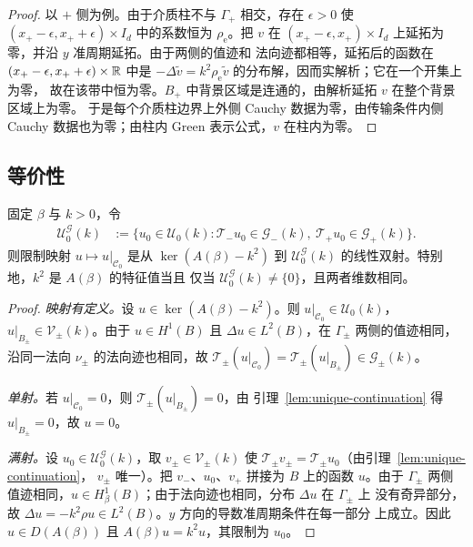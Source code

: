 \begin{proof}
  以 $+$ 侧为例。由于介质柱不与 $\Gamma_+$ 相交，存在 $\epsilon>0$ 使
  $(x_+-\epsilon,x_++\epsilon)\times I_d$ 中的系数恒为 $\rho_{\mathrm e}$。把 $v$ 在
  $(x_+-\epsilon,x_+)\times I_d$ 上延拓为零，并沿 $y$ 准周期延拓。由于两侧的值迹和
  法向迹都相等，延拓后的函数在 $(x_+-\epsilon,x_++\epsilon)\times\mathbb{R}$ 中是
  $-\Delta\tilde v=k^2\rho_{\mathrm e}\tilde v$ 的分布解，因而实解析；它在一个开集上为零，
  故在该带中恒为零。$B_+$ 中背景区域是连通的，由解析延拓 $v$ 在整个背景区域上为零。
  于是每个介质柱边界上外侧 Cauchy 数据为零，由传输条件内侧 Cauchy 数据也为零；由柱内
  Green 表示公式，$v$ 在柱内为零。
\end{proof}

\subsection{等价性}

\begin{proposition}[中心约化]
  \label{prop:center-reduction}
  固定 $\beta$ 与 $k>0$，令
  \begin{align}
    \mathcal U_0^{\mathcal G}(k)
    &:=\bigl\{u_0\in\mathcal U_0(k):
      \mathscr T_-u_0\in\mathcal G_-(k),\ \mathscr T_+u_0\in\mathcal G_+(k)\bigr\}.
    \label{eq:matched-center-space}
  \end{align}
  则限制映射 $u\mapsto u|_{\mathcal C_0}$ 是从 $\ker(A(\beta)-k^2)$ 到
  $\mathcal U_0^{\mathcal G}(k)$ 的线性双射。特别地，$k^2$ 是 $A(\beta)$ 的特征值当且
  仅当 $\mathcal U_0^{\mathcal G}(k)\ne\{0\}$，且两者维数相同。
\end{proposition}

\begin{proof}
  \emph{映射有定义。}设 $u\in\ker(A(\beta)-k^2)$。则 $u|_{\mathcal C_0}\in\mathcal U_0(k)$，
  $u|_{B_\pm}\in\mathcal V_\pm(k)$。由于 $u\in H^1(B)$ 且 $\Delta u\in L^2(B)$，在
  $\Gamma_\pm$ 两侧的值迹相同，沿同一法向 $\nu_\pm$ 的法向迹也相同，故
  $\mathscr T_\pm(u|_{\mathcal C_0})=\mathscr T_\pm(u|_{B_\pm})\in\mathcal G_\pm(k)$。

  \emph{单射。}若 $u|_{\mathcal C_0}=0$，则 $\mathscr T_\pm(u|_{B_\pm})=0$，由
  引理~\ref{lem:unique-continuation} 得 $u|_{B_\pm}=0$，故 $u=0$。

  \emph{满射。}设 $u_0\in\mathcal U_0^{\mathcal G}(k)$，取 $v_\pm\in\mathcal V_\pm(k)$
  使 $\mathscr T_\pm v_\pm=\mathscr T_\pm u_0$（由引理~\ref{lem:unique-continuation}，
  $v_\pm$ 唯一）。把 $v_-$、$u_0$、$v_+$ 拼接为 $B$ 上的函数 $u$。由于 $\Gamma_\pm$ 两侧
  值迹相同，$u\in H^1_\beta(B)$；由于法向迹也相同，分布 $\Delta u$ 在 $\Gamma_\pm$ 上
  没有奇异部分，故 $\Delta u=-k^2\rho u\in L^2(B)$。$y$ 方向的导数准周期条件在每一部分
  上成立。因此 $u\in D(A(\beta))$ 且 $A(\beta)u=k^2u$，其限制为 $u_0$。
\end{proof}

